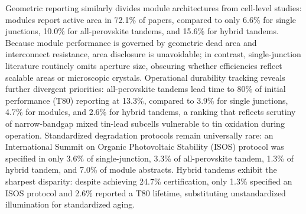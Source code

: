 \documentclass[
  11pt,
]{article}
\begin{document}
Geometric reporting similarly divides module architectures from
cell-level studies: modules report active area in 72.1\% of papers,
compared to only 6.6\% for single junctions, 10.0\% for all-perovskite
tandems, and 15.6\% for hybrid tandems. Because module performance is
governed by geometric dead area and interconnect resistance, area
disclosure is unavoidable; in contrast, single-junction literature
routinely omits aperture size, obscuring whether efficiencies reflect
scalable areas or microscopic crystals. Operational durability tracking
reveals further divergent priorities: all-perovskite tandems lead time
to 80\% of initial performance (T80) reporting at 13.3\%, compared to
3.9\% for single junctions, 4.7\% for modules, and 2.6\% for hybrid
tandems, a ranking that reflects scrutiny of narrow-bandgap mixed
tin-lead subcells vulnerable to tin oxidation during operation.
Standardized degradation protocols remain universally rare: an
International Summit on Organic Photovoltaic Stability (ISOS) protocol
was specified in only 3.6\% of single-junction, 3.3\% of all-perovskite
tandem, 1.3\% of hybrid tandem, and 7.0\% of module abstracts. Hybrid
tandems exhibit the sharpest disparity: despite achieving 24.7\%
certification, only 1.3\% specified an ISOS protocol and 2.6\% reported
a T80 lifetime, substituting unstandardized illumination for
standardized aging.
\end{document}
